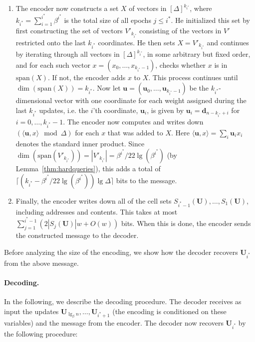 \documentclass[letterpaper]{article}
\newcommand{\rdelta}{\textbf{d}}
\newcommand{\is}{{i^*}}
\newcommand{\vecspan}{\textrm{span}}
\newcommand{\VecSet}{X}
\newcommand{\uv}{\textbf{u}}
\newcommand{\U}{\textbf{U}}
\begin{document}
\begin{enumerate}
\item The encoder now constructs a set $\VecSet$ of vectors in
  $[\Delta]^{k_\is}$, where $k_\is=\sum_{i=1}^\is \beta^\is$ is the
  total size of all epochs $j \leq \is$. He initialized this set by
  first constructing the set of vectors $V'_{k_\is}$ consisting of the
  vectors in $V'$ restricted onto the last $k_\is$ coordinates. He
  then sets $\VecSet = V'_{k_\is}$ and continues by iterating through
  all vectors in $[\Delta]^{k_\is}$, in some arbitrary but fixed
  order, and for each such vector $x=(x_0,\dots,x_{k_\is-1})$,
  checks whether $x$ is in $\vecspan(\VecSet)$. If not, the encoder
  adds $x$ to $\VecSet$. This process continues until
  $\dim(\vecspan(\VecSet))=k_\is$. Now let
  $\uv=(\uv_0,\dots,\uv_{k_\is-1})$ be the $k_\is$-dimensional vector
  with one coordinate for each weight assigned during the last $k_\is$
  updates, i.e. the $i$'th coordinate, $\uv_i$, is given by
  $\uv_i=\rdelta_{n-k_\is+i}$ for $i=0,\dots,k_\is-1$. The encoder now
  computes and writes down $(\langle \uv,x\rangle \mod \Delta)$ for
  each $x$ that was added to $\VecSet$. Here $\langle \uv,x \rangle =
  \sum_i \uv_ix_i$ denotes the standard inner product. Since
  $\dim(\vecspan(V'_{k_\is}))=|V'_{k_\is}| =
  \beta^\is/22\lg(\beta^\is)$ (by Lemma~\ref{thm:hardqueries}), this
  adds a total of $\lceil (k_\is-\beta^\is/22\lg(\beta^\is)) \lg
  \Delta \rceil$ bits to the message.

\item Finally, the encoder writes down all of the cell sets
  $S_{\is-1}(\U),\dots,S_1(\U)$, including addresses and
  contents. This takes at most $\sum_{j=1}^{\is-1}(2|S_j(\U)|w+O(w))$
  bits. When this is done, the encoder sends the constructed message
  to the decoder.
\end{enumerate}

Before analyzing the size of the encoding, we show how the decoder
recovers $\U_\is$ from the above message.

\paragraph{Decoding.}
In the following, we describe the decoding procedure. The decoder
receives as input the updates $\U_{\lg_\beta n},\dots,\U_{\is+1}$ (the
encoding is conditioned on these variables) and the message from the
encoder. The decoder now recovers $\U_\is$ by the following procedure:
\end{document}
